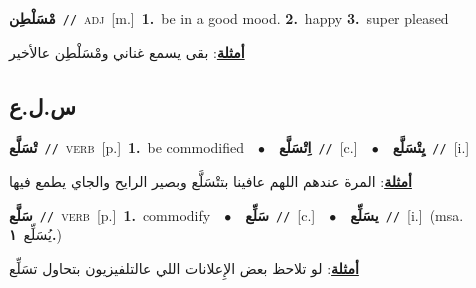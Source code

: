\documentclass[10pt,a4paper,twoside]{article} %
\begin{document}
\begin{multicols}{2}
{\setlength\topsep{0pt}\textbf{\foreignlanguage{arabic}{مْسَلْطِن}}\ {\color{gray}\texttt{//}\color{black}}\ \textsc{adj}\ [m.]\ \textbf{1.}~be in a good mood.  \textbf{2.}~happy  \textbf{3.}~super pleased\  \begin{flushright}\color{gray}\foreignlanguage{arabic}{\textbf{\underline{\foreignlanguage{arabic}{أمثلة}}}: بقى يسمع غناني ومْسَلْطِن عالأخير}\end{flushright}\color{black}} \vspace{2mm}

\vspace{-3mm}
\subsection*{\color{blue}\foreignlanguage{arabic}{س.ل.ع}\color{blue}{}} 

{\setlength\topsep{0pt}\textbf{\foreignlanguage{arabic}{تْسَلَّع}}\ {\color{gray}\texttt{//}\color{black}}\ \textsc{verb}\ [p.]\ \textbf{1.}~be commodified\ \ $\bullet$\ \ \setlength\topsep{0pt}\textbf{\foreignlanguage{arabic}{اِتْسَلَّع}}\ {\color{gray}\texttt{//}\color{black}}\ [c.]\ \ $\bullet$\ \ \setlength\topsep{0pt}\textbf{\foreignlanguage{arabic}{يِتْسَلَّع}}\ {\color{gray}\texttt{//}\color{black}}\ [i.]\  \begin{flushright}\color{gray}\foreignlanguage{arabic}{\textbf{\underline{\foreignlanguage{arabic}{أمثلة}}}: المرة عندهم اللهم عافينا بتتْسَلَّع وبصير الرايح والجاي يطمع فيها}\end{flushright}\color{black}} \vspace{2mm}

{\setlength\topsep{0pt}\textbf{\foreignlanguage{arabic}{سَلَّع}}\ {\color{gray}\texttt{//}\color{black}}\ \textsc{verb}\ [p.]\ \textbf{1.}~commodify\ \ $\bullet$\ \ \setlength\topsep{0pt}\textbf{\foreignlanguage{arabic}{سَلِّع}}\ {\color{gray}\texttt{//}\color{black}}\ [c.]\ \ $\bullet$\ \ \setlength\topsep{0pt}\textbf{\foreignlanguage{arabic}{يسَلِّع}}\ {\color{gray}\texttt{//}\color{black}}\ [i.]\ \color{gray}(msa. \foreignlanguage{arabic}{يُسَلِّع}~\foreignlanguage{arabic}{\textbf{١.}})\color{black}\  \begin{flushright}\color{gray}\foreignlanguage{arabic}{\textbf{\underline{\foreignlanguage{arabic}{أمثلة}}}: لو تلاحظ بعض الإِعلانات اللي عالتلفيزيون بتحاول تسَلِّع}\end{flushright}\color{black}} \vspace{2mm}


\end{multicols}
\end{document}
